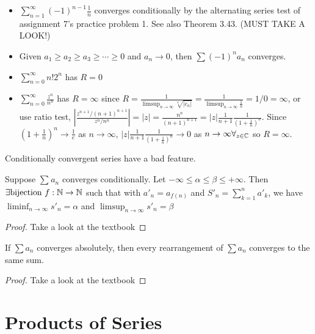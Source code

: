 \begin{example}
	\begin{itemize}
		\item $\sum_{n=1}^{\infty}{(-1)^{n-1}\frac{1}{n}}$ converges conditionally by the alternating series test of assignment 7's practice problem 1. See also Theorem 3.43. (MUST TAKE A LOOK!)
		\item Given $a_1\ge a_2\ge a_3\ge \cdots \ge 0$ and $a_{n}\to 0$, then $\sum{(-1)^{n}a_{n}}$ converges.
		\item $\sum_{n=0}^{\infty}{n!2^{n}}$ has $R=0$
		\item $\sum_{n=0}^{\infty}{\frac{z^{n}}{n^{n}}}$ has $R=\infty$ since $R=\frac{1}{\limsup_{n\to \infty}{\sqrt[n]{|c_{n}|}}}=\frac{1}{\limsup_{n\to \infty}{\frac{1}{n}}}=1/0=\infty$, or use ratio test, $|\frac{z^{n+1}/(n+1)^{n+1}}{z^{n}/n^{n}}|=|z|=\frac{n^{n}}{(n+1)^{n+1}}=|z|\frac{1}{n+1} \frac{1}{(1+\frac{1}{n})^{n}}$.
		      Since $(1+\frac{1}{n})^{n} \to  \frac{1}{e}$ as $n\to \infty$,
		      $|z|\frac{1}{n+1} \frac{1}{(1+\frac{1}{n})^{n}} \to 0$ as $n\to \infty \forall_{z \in \mathbb{C}}$ so $R=\infty$.
	\end{itemize}
\end{example}

\begin{remark}
	Conditionally convergent series have a bad feature.
\end{remark}

\begin{theorem}[Thm 3.54]
	\label{thm:3.54}
	Suppose $\sum_{}{a_{n}}$ converges conditionally.
	Let $-\infty\le \alpha\le \beta\le +\infty$. Then $\exists \text{bijection }f: \mathbb{N}\to \mathbb{N}$ such that with $a'_{n}=a_{f(n)}$ and $S'_n=\sum_{k=1}^{n}{a'_k}$, we have $\liminf_{n\to \infty}{s'_n}=\alpha$ and $\limsup_{n\to \infty}{s'_n}=\beta$
	\begin{proof}
		Take a look at the textbook
	\end{proof}
\end{theorem}

\begin{theorem}[Thm 3.55]
	\label{thm:3.55}
	If $\sum{a_{n}}$ converges absolutely, then every rearrangement of $\sum{a_{n}}$ converges to the same sum.
	\begin{proof}
		Take a look at the textbook
	\end{proof}
\end{theorem}

\section{Products of Series}
